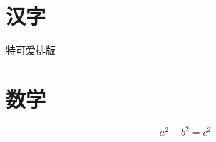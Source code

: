 \documentclass[UTF8]{ctexart}
\begin{document}
\section{汉字}
特可爱排版
\section{数学}
\[
    a^2 + b^2 = c^2
\]
\end{document}
